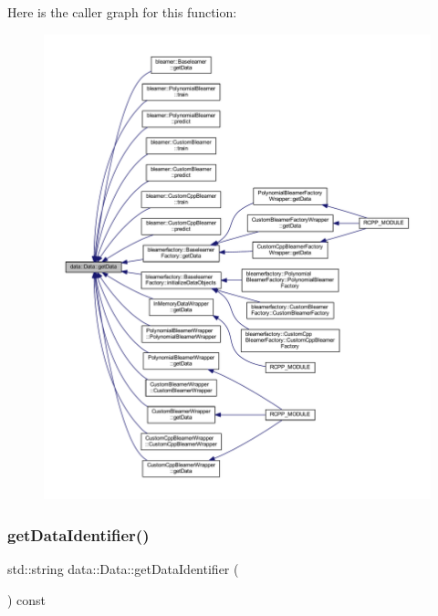 Here is the caller graph for this function\+:\nopagebreak
\begin{figure}[H]
\begin{center}
\leavevmode
\includegraphics[width=350pt]{classdata_1_1_data_aa4073af1bc8ccc7c50809e1676436eb4_icgraph}
\end{center}
\end{figure}
\mbox{\label{classdata_1_1_data_a1af63a4e5aa708de31e1ffdd727a4e16}} 
\subsubsection{\texorpdfstring{get\+Data\+Identifier()}{getDataIdentifier()}}
{\footnotesize\ttfamily std\+::string data\+::\+Data\+::get\+Data\+Identifier (\begin{DoxyParamCaption}{ }\end{DoxyParamCaption}) const}


